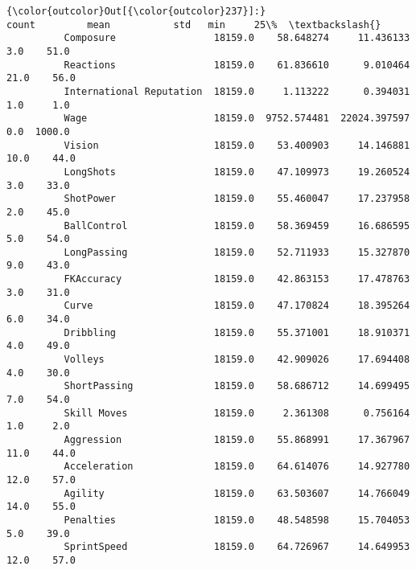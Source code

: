 \documentclass[11pt]{article}
\begin{document}
\begin{Verbatim}[commandchars=\\\{\}]
{\color{outcolor}Out[{\color{outcolor}237}]:}                             count         mean           std   min     25\%  \textbackslash{}
          Composure                 18159.0    58.648274     11.436133   3.0    51.0   
          Reactions                 18159.0    61.836610      9.010464  21.0    56.0   
          International Reputation  18159.0     1.113222      0.394031   1.0     1.0   
          Wage                      18159.0  9752.574481  22024.397597   0.0  1000.0   
          Vision                    18159.0    53.400903     14.146881  10.0    44.0   
          LongShots                 18159.0    47.109973     19.260524   3.0    33.0   
          ShotPower                 18159.0    55.460047     17.237958   2.0    45.0   
          BallControl               18159.0    58.369459     16.686595   5.0    54.0   
          LongPassing               18159.0    52.711933     15.327870   9.0    43.0   
          FKAccuracy                18159.0    42.863153     17.478763   3.0    31.0   
          Curve                     18159.0    47.170824     18.395264   6.0    34.0   
          Dribbling                 18159.0    55.371001     18.910371   4.0    49.0   
          Volleys                   18159.0    42.909026     17.694408   4.0    30.0   
          ShortPassing              18159.0    58.686712     14.699495   7.0    54.0   
          Skill Moves               18159.0     2.361308      0.756164   1.0     2.0   
          Aggression                18159.0    55.868991     17.367967  11.0    44.0   
          Acceleration              18159.0    64.614076     14.927780  12.0    57.0   
          Agility                   18159.0    63.503607     14.766049  14.0    55.0   
          Penalties                 18159.0    48.548598     15.704053   5.0    39.0   
          SprintSpeed               18159.0    64.726967     14.649953  12.0    57.0   
          

\end{Verbatim}
\end{document}
